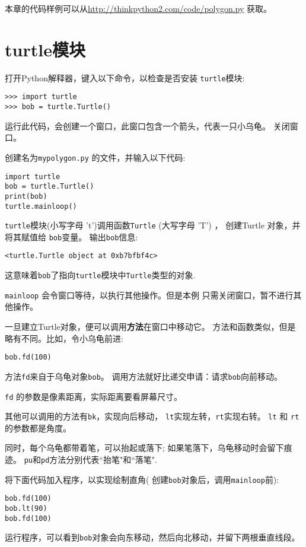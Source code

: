 \documentclass[10pt]{book}
\begin{document}
本章的代码样例可以从\url{http://thinkpython2.com/code/polygon.py}
获取。


\section{turtle模块}
\label{turtle}

打开Python解释器，键入以下命令，以检查是否安装 {\tt turtle}模块:

\begin{verbatim}
>>> import turtle
>>> bob = turtle.Turtle()
\end{verbatim}

运行此代码，会创建一个窗口，此窗口包含一个箭头，代表一只小乌龟。
关闭窗口。

创建名为{\tt mypolygon.py} 的文件，并输入以下代码:

\begin{verbatim}
import turtle
bob = turtle.Turtle()
print(bob)
turtle.mainloop()
\end{verbatim}
%
 {\tt turtle}模块(小写字母 't')调用函数{\tt Turtle} (大写字母 'T') ，
创建Turtle 对象，并将其赋值给 {\tt bob}变量。
输出{\tt bob}信息:

\begin{verbatim}
<turtle.Turtle object at 0xb7bfbf4c>
\end{verbatim}
%
这意味着{\tt bob}了指向{\tt turtle}模块中{\tt Turtle}类型的对象.

\verb"mainloop" 会令窗口等待，以执行其他操作。但是本例
只需关闭窗口，暂不进行其他操作。

一旦建立Turtle对象，便可以调用{\bf 方法}在窗口中移动它。
方法和函数类似，但是略有不同。比如，令小乌龟前进:

\begin{verbatim}
bob.fd(100)
\end{verbatim}
%
方法{\tt fd}来自于乌龟对象{\tt bob}。
调用方法就好比递交申请：请求{\tt bob}向前移动。

{\tt fd} 的参数是像素距离，实际距离要看屏幕尺寸。

其他可以调用的方法有{\tt bk}，实现向后移动，
{\tt lt}实现左转，{\tt rt}实现右转。
{\tt lt} 和 {\tt rt}的参数都是角度。

同时，每个乌龟都带着笔，可以抬起或落下;
如果笔落下，乌龟移动时会留下痕迹。
{\tt pu}和{\tt pd}方法分别代表``抬笔"和``落笔".

将下面代码加入程序，以实现绘制直角(
创建{\tt bob}对象后，调用\verb"mainloop"前):

\begin{verbatim}
bob.fd(100)
bob.lt(90)
bob.fd(100)
\end{verbatim}
%
运行程序，可以看到{\tt bob}对象会向东移动，然后向北移动，并留下两根垂直线段。
\end{document}
